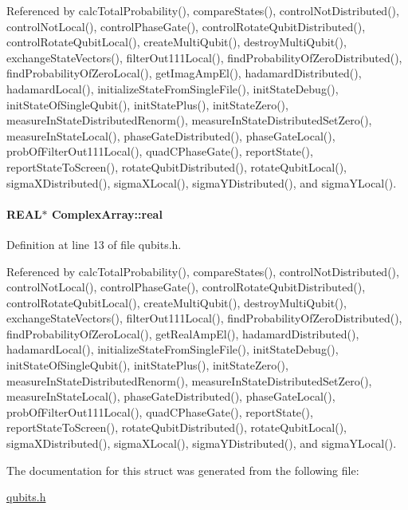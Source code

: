 Referenced by calcTotalProbability(), compareStates(), controlNotDistributed(), controlNotLocal(), controlPhaseGate(), controlRotateQubitDistributed(), controlRotateQubitLocal(), createMultiQubit(), destroyMultiQubit(), exchangeStateVectors(), filterOut111Local(), findProbabilityOfZeroDistributed(), findProbabilityOfZeroLocal(), getImagAmpEl(), hadamardDistributed(), hadamardLocal(), initializeStateFromSingleFile(), initStateDebug(), initStateOfSingleQubit(), initStatePlus(), initStateZero(), measureInStateDistributedRenorm(), measureInStateDistributedSetZero(), measureInStateLocal(), phaseGateDistributed(), phaseGateLocal(), probOfFilterOut111Local(), quadCPhaseGate(), reportState(), reportStateToScreen(), rotateQubitDistributed(), rotateQubitLocal(), sigmaXDistributed(), sigmaXLocal(), sigmaYDistributed(), and sigmaYLocal().\hypertarget{structComplexArray_a4195cac6c784ea1b6271f1c7dba1548a}{
\paragraph[{real}]{\setlength{\rightskip}{0pt plus 5cm}REAL$\ast$ {\bf ComplexArray::real}}\hfill}
\label{structComplexArray_a4195cac6c784ea1b6271f1c7dba1548a}


Definition at line 13 of file qubits.h.

Referenced by calcTotalProbability(), compareStates(), controlNotDistributed(), controlNotLocal(), controlPhaseGate(), controlRotateQubitDistributed(), controlRotateQubitLocal(), createMultiQubit(), destroyMultiQubit(), exchangeStateVectors(), filterOut111Local(), findProbabilityOfZeroDistributed(), findProbabilityOfZeroLocal(), getRealAmpEl(), hadamardDistributed(), hadamardLocal(), initializeStateFromSingleFile(), initStateDebug(), initStateOfSingleQubit(), initStatePlus(), initStateZero(), measureInStateDistributedRenorm(), measureInStateDistributedSetZero(), measureInStateLocal(), phaseGateDistributed(), phaseGateLocal(), probOfFilterOut111Local(), quadCPhaseGate(), reportState(), reportStateToScreen(), rotateQubitDistributed(), rotateQubitLocal(), sigmaXDistributed(), sigmaXLocal(), sigmaYDistributed(), and sigmaYLocal().

The documentation for this struct was generated from the following file:\begin{DoxyCompactItemize}
\item 
\hyperlink{qubits_8h}{qubits.h}\end{DoxyCompactItemize}
